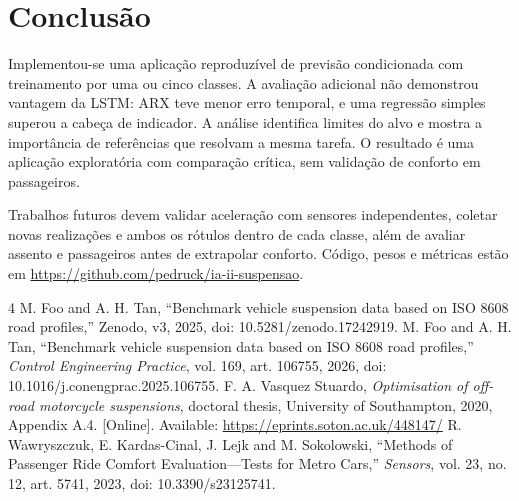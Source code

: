 \documentclass[conference]{IEEEtran}
\begin{document}
\section{Conclusão}
Implementou-se uma aplicação reproduzível de previsão condicionada com treinamento por uma ou cinco classes. A avaliação adicional não demonstrou vantagem da LSTM: ARX teve menor erro temporal, e uma regressão simples superou a cabeça de indicador. A análise identifica limites do alvo e mostra a importância de referências que resolvam a mesma tarefa. O resultado é uma aplicação exploratória com comparação crítica, sem validação de conforto em passageiros.

Trabalhos futuros devem validar aceleração com sensores independentes, coletar novas realizações e ambos os rótulos dentro de cada classe, além de avaliar assento e passageiros antes de extrapolar conforto. Código, pesos e métricas estão em \url{https://github.com/pedruck/ia-ii-suspensao}.

\begin{thebibliography}{4}
 M. Foo and A. H. Tan, ``Benchmark vehicle suspension data based on ISO 8608 road profiles,'' Zenodo, v3, 2025, doi: 10.5281/zenodo.17242919.
 M. Foo and A. H. Tan, ``Benchmark vehicle suspension data based on ISO 8608 road profiles,'' \emph{Control Engineering Practice}, vol. 169, art. 106755, 2026, doi: 10.1016/j.conengprac.2025.106755.
 F. A. Vasquez Stuardo, \emph{Optimisation of off-road motorcycle suspensions}, doctoral thesis, University of Southampton, 2020, Appendix A.4. [Online]. Available: \url{https://eprints.soton.ac.uk/448147/}
 R. Wawryszczuk, E. Kardas-Cinal, J. Lejk and M. Sokolowski, ``Methods of Passenger Ride Comfort Evaluation---Tests for Metro Cars,'' \emph{Sensors}, vol. 23, no. 12, art. 5741, 2023, doi: 10.3390/s23125741.
\end{thebibliography}
\end{document}
